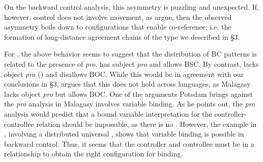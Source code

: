 \documentclass[output=paper]{langsci/langscibook}
\begin{document}
\ea%
    \label{ex:alexiadou:48}
    \z
\z
 
On the backward control analysis, this asymmetry is puzzling and unexpected. If, however, control does not involve movement, as \citet{Tsakali2017} argue, then the observed asymmetry boils down to configurations that enable co-reference; i.e. the formation of long-distance agreement chains of the type we described in §3. 

For , the above behavior seems to suggest that the distribution of BC patterns is related to the presence of \textit{pro}.  has subject \textit{pro} and allows BSC. By contrast,  lacks object \textit{pro} (\citealt{Giannakidou1997}) and disallows BOC. While this would be in agreement with our conclusions in §3, \citet{Potsdam2006Backward,Potsdam2009} argues that this does not hold across languages, as Malagasy lacks object \textit{pro} but allows BOC. One of the arguments Potsdam brings against the \textit{pro} analysis in Malagasy involves variable binding. As he points out, the \textit{pro} analysis would predict that a bound variable interpretation for the controller-controllee relation should be impossible, as there is no . However, the example in , involving a distributed universal , shows that variable binding is possible in backward control. Thus, it seems that the controller and controllee must be in a  relationship to obtain the right configuration for binding. 
\end{document}
